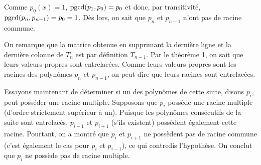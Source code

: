 Comme $p_0(x) = 1$, $\operatorname{pgcd}(p_1,p_0) = p_0$ et donc, par transitivité,
$\operatorname{pgcd}(p_n, p_{n-1}) = p_0 = 1$.
Dès lors, on sait que $p_n$ et $p_{n-1}$ n'ont pas de racine commune.


On remarque que la matrice obtenue en supprimant
la dernière ligne et la dernière colonne de $T_n$ est par définition $T_{n-1}$.
Par le théorème 1, on sait que leurs valeurs propres sont entrelacées.
Comme leurs valeurs propres sont les racines des polynômes $p_n$ et $p_{n-1}$, on peut dire que leurs racines sont entrelacées.

Essayons maintenant de déterminer si un des polynômes de cette suite,
disons $p_i$, peut posséder une racine multiple.
Supposons que $p_i$ possède une racine multiple
(d'ordre strictement supérieur à un).
Puisque les polynômes consécutifs de la suite sont entrelacés,
$p_{i-1}$ et $p_{i+1}$ (s'ils existent) possèdent également cette racine.
Pourtant, on a montré que $p_i$ et $p_{i+1}$ ne possèdent pas de racine commune
(c'est également le cas pour $p_i$ et $p_{i-1}$), ce qui contredis l'hypothèse.
On conclut que $p_i$ ne possède pas de racine multiple.



